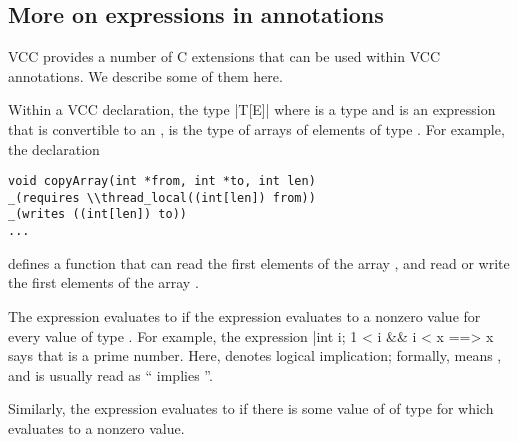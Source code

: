 




\subsection*{More on expressions in annotations}
VCC provides a number of C extensions that can be used within VCC
annotations. We describe some of them here.

Within a VCC declaration, the type \vcc|T[E]| where  is
a type and  is an expression that is convertible to an
, is the type of arrays of  elements of type
. For example, the declaration
\begin{lstlisting}
void copyArray(int *from, int *to, int len)
_(requires \\thread_local((int[len]) from))
_(writes ((int[len]) to))
...
\end{lstlisting}
defines a function that can read the first  elements of the
array , and read or write the first  elements of
the array .

The expression  evaluates to  if the
expression  evaluates to a nonzero value for every value 
 of type . For example, the expression 
\vcc|\forall int i; 1 < i && i < x ==> x %
says that  is a prime number.
Here, \vcc{==>} denotes logical implication; formally,
 means , and is usually 
read as `` implies ''.

Similarly, the expression  evaluates to  if there
is some value of  of type  for which  evaluates
to a nonzero value.

